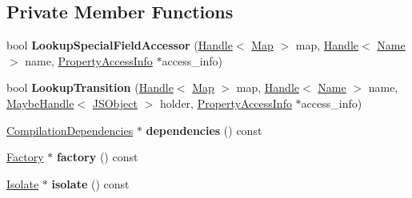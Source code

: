 \subsection*{Private Member Functions}
\begin{DoxyCompactItemize}
\item 
bool {\bfseries Lookup\+Special\+Field\+Accessor} (\hyperlink{classv8_1_1internal_1_1_handle}{Handle}$<$ \hyperlink{classv8_1_1internal_1_1_map}{Map} $>$ map, \hyperlink{classv8_1_1internal_1_1_handle}{Handle}$<$ \hyperlink{classv8_1_1internal_1_1_name}{Name} $>$ name, \hyperlink{classv8_1_1internal_1_1compiler_1_1_property_access_info}{Property\+Access\+Info} $\ast$access\+\_\+info)\hypertarget{classv8_1_1internal_1_1compiler_1_1_access_info_factory_aaa37cfffafa24b3c04487708dab6e99b}{}\label{classv8_1_1internal_1_1compiler_1_1_access_info_factory_aaa37cfffafa24b3c04487708dab6e99b}

\item 
bool {\bfseries Lookup\+Transition} (\hyperlink{classv8_1_1internal_1_1_handle}{Handle}$<$ \hyperlink{classv8_1_1internal_1_1_map}{Map} $>$ map, \hyperlink{classv8_1_1internal_1_1_handle}{Handle}$<$ \hyperlink{classv8_1_1internal_1_1_name}{Name} $>$ name, \hyperlink{classv8_1_1internal_1_1_maybe_handle}{Maybe\+Handle}$<$ \hyperlink{classv8_1_1internal_1_1_j_s_object}{J\+S\+Object} $>$ holder, \hyperlink{classv8_1_1internal_1_1compiler_1_1_property_access_info}{Property\+Access\+Info} $\ast$access\+\_\+info)\hypertarget{classv8_1_1internal_1_1compiler_1_1_access_info_factory_ac4e8c3a84f8f63a087a8ad76978bcf76}{}\label{classv8_1_1internal_1_1compiler_1_1_access_info_factory_ac4e8c3a84f8f63a087a8ad76978bcf76}

\item 
\hyperlink{classv8_1_1internal_1_1_compilation_dependencies}{Compilation\+Dependencies} $\ast$ {\bfseries dependencies} () const \hypertarget{classv8_1_1internal_1_1compiler_1_1_access_info_factory_ad49204a5516119cd4ecf2092c1a5fbf3}{}\label{classv8_1_1internal_1_1compiler_1_1_access_info_factory_ad49204a5516119cd4ecf2092c1a5fbf3}

\item 
\hyperlink{classv8_1_1internal_1_1_factory}{Factory} $\ast$ {\bfseries factory} () const \hypertarget{classv8_1_1internal_1_1compiler_1_1_access_info_factory_a506bc9c13103839833703cfac3433d23}{}\label{classv8_1_1internal_1_1compiler_1_1_access_info_factory_a506bc9c13103839833703cfac3433d23}

\item 
\hyperlink{classv8_1_1internal_1_1_isolate}{Isolate} $\ast$ {\bfseries isolate} () const \hypertarget{classv8_1_1internal_1_1compiler_1_1_access_info_factory_a2b5f9560950230607d9bc9da5ad35809}{}\label{classv8_1_1internal_1_1compiler_1_1_access_info_factory_a2b5f9560950230607d9bc9da5ad35809}


\end{DoxyCompactItemize}
